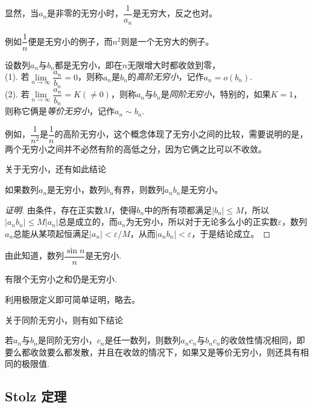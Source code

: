 显然，当$a_n$是非零的无穷小时，$\dfrac{1}{a_n}$是无穷大，反之也对。

例如$\dfrac{1}{n}$便是无穷小的例子，而$n^2$则是一个无穷大的例子。

\begin{definition}
   设数列$a_n$与$b_n$都是无穷小，即在$n$无限增大时都收敛到零，\\
  (1). 若$\lim\limits_{n \to \infty} \dfrac{a_n}{b_n} = 0$，则称$a_n$是$b_n$的\emph{高阶无穷小}，记作$a_n=o(b_n)$. \\
  (2). 若$\lim\limits_{n \to \infty} \dfrac{a_n}{b_n} = K(\neq 0)$，则称$a_n$与$b_n$是\emph{同阶无穷小}，特别的，如果$K=1$，则称它俩是\emph{等价无穷小}，记作$a_n \sim b_n$.
\end{definition}

例如，$\dfrac{1}{n^2}$是$\dfrac{1}{n}$的高阶无穷小，这个概念体现了无穷小之间的比较，需要说明的是，两个无穷小之间并不必然有阶的高低之分，因为它俩之比可以不收敛。


关于无穷小，还有如此结论
\begin{theorem}
  如果数列$a_n$是无穷小，数列$b_n$有界，则数列$a_nb_n$是无穷小。
\end{theorem}

\begin{proof}[证明]
  由条件，存在正实数$M$，使得$b_n$中的所有项都满足$|b_n|\leqslant M$，所以$|a_nb_n| \leqslant M |a_n|$总是成立的，而$a_n$为无穷小，所以对于无论多么小的正实数$\varepsilon$，数列$a_n$总能从某项起恒满足$|a_n|<\varepsilon/M$，从而$|a_nb_n|<\varepsilon$，于是结论成立。
\end{proof}

由此知道，数列$\dfrac{\sin{n}}{n}$是无穷小.

\begin{theorem}
  有限个无穷小之和仍是无穷小.
\end{theorem}

利用极限定义即可简单证明，略去。

关于同阶无穷小，则有如下结论
\begin{theorem}
  若$a_n$与$b_n$是同阶无穷小，$c_n$是任一数列，则数列$a_nc_n$与$b_nc_n$的收敛性情况相同，即要么都收敛要么都发散，并且在收敛的情况下，如果又是等价无穷小，则还具有相同的极限值.
\end{theorem}

\subsection{Stolz 定理}
\label{sec:stolz-theorem}

